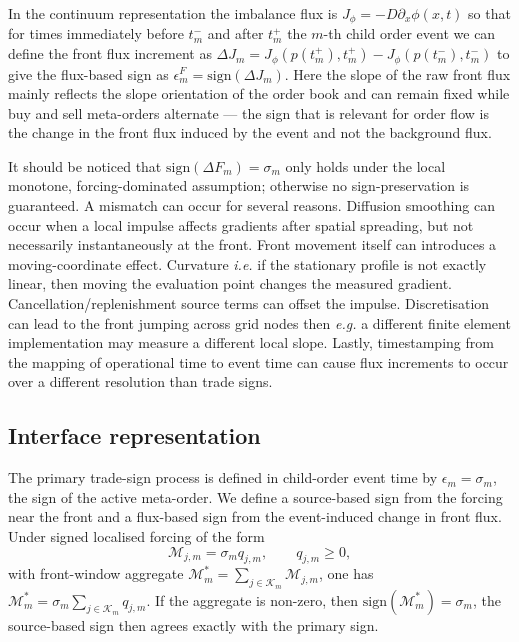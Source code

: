 \documentclass[5p,final]{elsarticle}
\newcommand{\sign}{\mathrm{sign}}
\begin{document}
In the continuum representation the imbalance flux is $J_{\phi} =  - D \partial_x \phi(x,t)$ so that for times immediately before $t_m^-$ and after $t_m^+$ the $m$-th child order event we can define the front flux increment as $\Delta J_m = J_{\phi}(p(t_m^+),t_m^+) - J_{\phi}(p(t_m^-),t_m^-)$ to give the flux-based sign as $\epsilon^F_m = \sign(\Delta J_m)$. Here the slope of the raw front flux mainly reflects the slope orientation of the order book and can remain fixed while buy and sell meta-orders alternate --- the sign that is relevant for order flow is the change in the front flux induced by the event and not the background flux. 

It should be noticed that $\sign(\Delta F_m) = \sigma_m$ only holds under the local monotone, forcing-dominated assumption; otherwise no sign-preservation is guaranteed. A mismatch can occur for several reasons. Diffusion smoothing can occur when a  local impulse affects gradients after spatial spreading, but not necessarily instantaneously at the front. Front movement itself can introduces a moving-coordinate effect. Curvature {\it i.e.} if the stationary profile is not exactly linear, then moving the evaluation point changes the measured gradient. Cancellation/replenishment source terms can offset the impulse. Discretisation can lead to the front jumping across grid nodes then {\it e.g.} a different finite element implementation may measure a different local slope. Lastly, timestamping from the mapping of operational time to event time can cause flux increments to occur over a different resolution than trade signs.

\subsection{Interface representation}  \label{sec:signs}

The primary trade-sign process is defined in child-order event time by $\epsilon_m=\sigma_m$, the sign of the active meta-order. We define a source-based sign from the forcing near the front and a flux-based sign from the event-induced change in front flux. Under signed localised forcing of the form
\begin{equation}
\mathcal M_{j,m}=\sigma_m q_{j,m},\qquad q_{j,m}\ge 0,
\end{equation}
with front-window aggregate $\mathcal M_m^{*}=\sum_{j\in\mathcal K_m}\mathcal M_{j,m}$, one has $\mathcal M_m^{*}=\sigma_m\sum_{j\in\mathcal K_m}q_{j,m}$. If the aggregate is non-zero, then $\sign(\mathcal M_m^{*})=\sigma_m$, the source-based sign then agrees exactly with the primary sign. 
\end{document}
